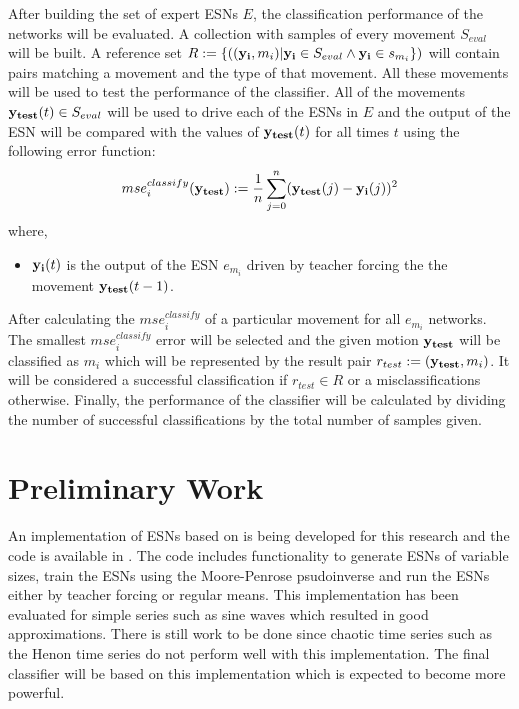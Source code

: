 \documentclass[10pt]{article}
\begin{document}
After building the set of expert ESNs $E$, the classification performance of the networks will be evaluated. A collection with samples of every movement $S_{eval}$ will be built. A reference set $R:=\{(({\bf y_i},m_i) | {\bf y_i} \in S_{eval} \wedge {\bf y_i}\in s_{m_i}\})$ will contain pairs matching a movement and the type of that movement. All these movements will be used to test the performance of the classifier. All of the movements ${\bf y_{test}}(t)\in S_{eval}$ will be used to drive each of the ESNs in $E$ and the output of the ESN will be compared with the values of ${\bf y_{test}}(t)$ for all times $t$ using the following error function:
\[
mse_i^{classify}({\bf y_{test}}):=\frac{1}{n}\sum_{j=0}^{n}({\bf y_{test}}(j) - {\bf y_i}(j))^2
\]
where, 
\begin{itemize}
  \item ${\bf y_i}(t)$ is the output of the ESN $e_{m_i}$ driven by teacher forcing the the movement ${\bf y_{test}}(t-1)$. 
\end{itemize}
After calculating the $mse_{i}^{classify}$ of a particular movement for all $e_{m_i}$ networks. The smallest $mse_{i}^{classify}$ error will be selected and the given motion ${\bf y_{test}}$ will be classified as $m_i$ which will be represented by the result pair $r_{test}:=({\bf y_{test}},m_i)$. It will be considered a successful classification if $r_{test}\in R$ or a misclassifications otherwise. Finally, the performance of the classifier will be calculated by dividing the number of successful classifications by the total number of samples given.

\section{Preliminary Work}
An implementation of ESNs based on \cite{JaegerESNTutorial} is being developed for this research and the code is available in \cite{LambdaNN}. The code includes functionality to generate ESNs of variable sizes, train the ESNs using the Moore-Penrose psudoinverse and run the ESNs either by teacher forcing or regular means. This implementation has been evaluated for simple series such as sine waves which resulted in good approximations. There is still work to be done since chaotic time series such as the Henon time series do not perform well with this implementation. The final classifier will be based on this implementation which is expected to become more powerful.
\end{document}

